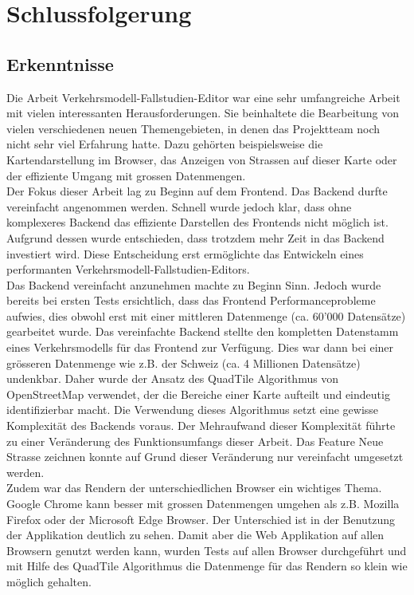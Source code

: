 \chapter{Schlussfolgerung}
\section{Erkenntnisse}
Die Arbeit \glqq{}Verkehrsmodell-Fallstudien-Editor\grqq{} war eine sehr umfangreiche Arbeit mit vielen interessanten Herausforderungen. Sie beinhaltete die Bearbeitung von vielen verschiedenen neuen Themengebieten, in denen das Projektteam noch nicht sehr viel Erfahrung hatte. Dazu gehörten beispielsweise die Kartendarstellung im Browser, das Anzeigen von Strassen auf dieser Karte oder der effiziente Umgang mit grossen Datenmengen.\\
Der Fokus dieser Arbeit lag zu Beginn auf dem Frontend. Das Backend durfte vereinfacht angenommen werden. Schnell wurde jedoch klar, dass ohne komplexeres Backend das effiziente Darstellen des Frontends nicht möglich ist. Aufgrund dessen wurde entschieden, dass trotzdem mehr Zeit in das Backend investiert wird. Diese Entscheidung erst ermöglichte das Entwickeln eines performanten Verkehrsmodell-Fallstudien-Editors.\\
Das Backend vereinfacht anzunehmen machte zu Beginn Sinn. Jedoch wurde bereits bei ersten Tests ersichtlich, dass das Frontend Performanceprobleme aufwies, dies obwohl erst mit einer mittleren Datenmenge (ca. 60'000 Datensätze) gearbeitet wurde. Das vereinfachte Backend stellte den kompletten Datenstamm eines Verkehrsmodells für das Frontend zur Verfügung. Dies war dann bei einer grösseren Datenmenge wie z.B. der Schweiz (ca. 4 Millionen Datensätze) undenkbar. Daher wurde der Ansatz des QuadTile Algorithmus von OpenStreetMap \cite{OSMQuadTiles} verwendet, der die Bereiche einer Karte aufteilt und eindeutig identifizierbar macht. Die Verwendung dieses Algorithmus setzt eine gewisse Komplexität des Backends voraus. Der Mehraufwand dieser Komplexität führte zu einer Veränderung des Funktionsumfangs dieser Arbeit. Das Feature \glqq{}Neue Strasse zeichnen\grqq{} konnte auf Grund dieser Veränderung nur vereinfacht umgesetzt werden.\\
Zudem war das Rendern der unterschiedlichen Browser ein wichtiges Thema.
Google Chrome kann besser mit grossen Datenmengen umgehen als z.B. Mozilla Firefox oder der Microsoft Edge Browser. Der Unterschied ist in der Benutzung der Applikation deutlich zu sehen. Damit aber die Web Applikation auf allen Browsern genutzt werden kann, wurden Tests auf allen Browser durchgeführt und mit Hilfe des QuadTile Algorithmus die Datenmenge für das Rendern so klein wie möglich gehalten.\\

